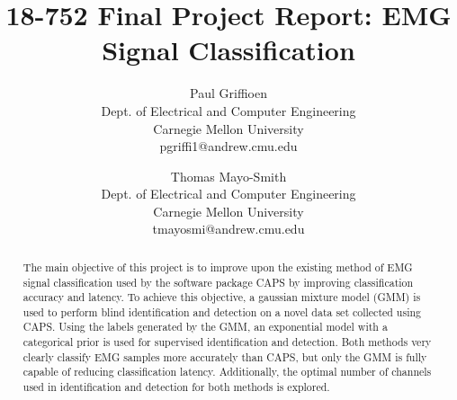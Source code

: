 \documentclass[times, 10pt,twocolumn]{article}
\begin{document}
\title{18-752 Final Project Report: EMG Signal Classification}

\author{Paul Griffioen\\Dept. of Electrical and Computer Engineering\\Carnegie Mellon University\\ pgriffi1@andrew.cmu.edu\\
\and
Thomas Mayo-Smith\\Dept. of Electrical and Computer Engineering\\Carnegie Mellon University\\tmayosmi@andrew.cmu.edu\\
}

\maketitle
\thispagestyle{empty}

\begin{abstract}
The main objective of this project is to improve upon the existing method of EMG signal classification used by the software package CAPS by improving classification accuracy and latency. To achieve this objective, a gaussian mixture model (GMM) is used to perform blind identification and detection on a novel data set collected using CAPS. Using the labels generated by the GMM, an exponential model with a categorical prior is used for supervised identification and detection. Both methods very clearly classify EMG samples more accurately than CAPS, but only the GMM is fully capable of reducing classification latency. Additionally, the optimal number of channels used in identification and detection for both methods is explored.
\end{abstract}

\end{document}
